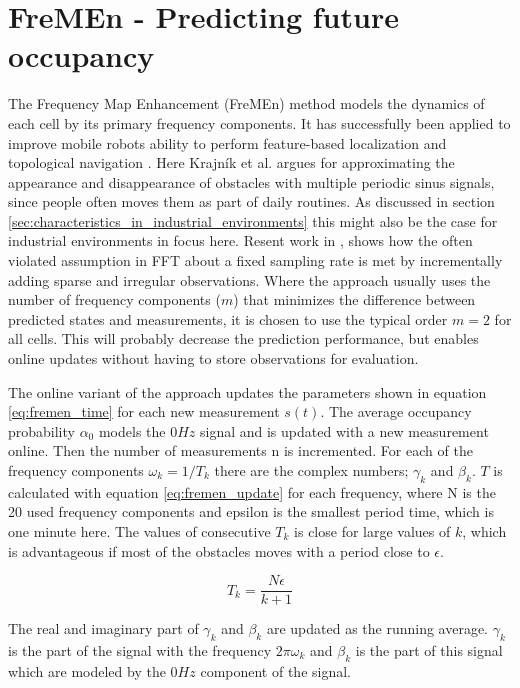 \section{FreMEn - Predicting future occupancy}
\label{sec:fremen}
The  Frequency Map Enhancement (FreMEn) method models the dynamics of each cell by its primary frequency components. It has successfully been applied to improve mobile robots ability to perform feature-based localization \cite{online_fremen} and topological navigation \cite{fentanes2015}. Here Krajník et al. argues for approximating the appearance and disappearance of obstacles with multiple periodic sinus signals,  since people often moves them as part of daily routines. As discussed in section \ref{sec:characteristics_in_industrial_environments} this might also be the case for industrial environments in focus here.  Resent work in \cite{life_long_exploration}, shows how the often violated assumption in FFT about a fixed sampling rate is met by incrementally adding sparse and irregular observations. Where the approach usually uses the number of frequency components ($m$) that minimizes the difference between predicted states and measurements, it is chosen to use the typical order $m=2$ \cite{life_long_exploration} for all cells. This will probably decrease the prediction performance, but enables online updates without having to store observations for evaluation.

The online variant of the approach updates the parameters shown in equation \ref{eq:fremen_time} for each new measurement $s(t)$. 
The average occupancy probability $\alpha_0$ models the $0Hz$ signal and is updated with a new measurement online.
Then the number of measurements n is incremented.
For each of the frequency components $\omega_k=1/T_k$ there are the complex numbers; $\gamma_k$ and $\beta_k$. 
$T$ is calculated with equation \ref{eq:fremen_update} for each frequency, where N is the 20 used frequency components and epsilon is the smallest period time, which is one minute here. 
The values of consecutive $T_k$ is close for large values of $k$, which is advantageous if most of the obstacles moves with a period close to $\epsilon$.

\begin{equation}
    T_k = \frac{N \epsilon}{k+1}
    \label{eq:fremen_time}
\end{equation}

The real and imaginary part of $\gamma_k$ and $\beta_k$ are updated as the running average. $\gamma_k$ is the part of the signal with the frequency $2 \pi \omega_k$ and $\beta_k$ is the part of this signal which are modeled by the $0Hz$ component of the signal.

